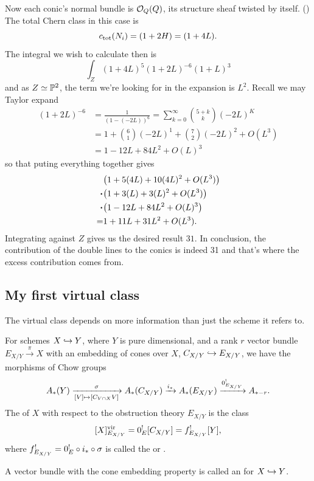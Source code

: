 \documentclass[12pt]{memoir}
\begin{document}
Now each conic's normal bundle is \(\mathcal{O}_Q(Q)\), its structure sheaf twisted by itself. () The total Chern class in this case is
\[
    c_{\operatorname{tot}}(N_i)=(1+2H)=(1+4L).
\]
The integral we wish to calculate then is
\[
    \int_Z(1+4L)^5(1+2L)^{-6}(1+L)^3
\]
and as \(Z\simeq\mathbb{P}^2\), the term we're looking for in the expansion is \(L^2\). Recall we may Taylor expand
\begin{align*}
    (1+2L)^{-6} & =\frac{1}{(1-(-2L))^6}=\sum_{k=0}^\infty\binom{5+k}{k}(-2L)^K \\
                & =1+\binom{6}{1}(-2L)^1+\binom{7}{2}(-2L)^2+O(L^3)             \\
                & =1-12L+84L^2+O(L)^3
\end{align*}
so that puting everything together gives
\begin{align*}
       & \bigl(1+5(4L)+10(4L)^2+O(L^3)\bigr) \\
    \. & \bigl(1+3(L)+3(L)^2+O(L^3)\bigr)    \\
    \. & \bigl(1-12L+84L^2+O(L)^3\bigr)      \\
    =  & 1+11L+31L^2+O(L^3).
\end{align*}
Integrating against \(Z\) gives us the desired result \(31\). In conclusion, the contribution of the double lines to the conics is indeed 31 and that's where the excess contribution comes from.

\subsection{My first virtual class}

The virtual class depends on more information than just the scheme it refers to.

\begin{Def}\label{def-virtual-class}
    For schemes \(X\hookrightarrow Y\), where \(Y\) is pure dimensional, and a rank \(r\) vector bundle \(E_{X/Y}\xrightarrow[]{\pi}X\) with an embedding of cones over \(X\), \(C_{X/Y}\hookrightarrow E_{X/Y}\), we have the morphisms of Chow groups
    \[
        A_\ast(Y)\xrightarrow[{[V]\mapsto[C_{V\cap X}V]}]{\sigma}A_\ast(C_{X/Y})\xrightarrow[]{i_\ast}A_{\ast}(E_{X/Y})\xrightarrow[]{0^{!}_{E_{X/Y}}}A_{\ast-r}.
    \]
    The  of \(X\) with respect to the obstruction theory \(E_{X/Y}\) is the class
    \[
        [X]^{\mathrm{vir}}_{E_{X/Y}}=0^{!}_E[C_{X/Y}]=f^{!}_{E_{X/Y}}[Y],
    \]
    where \(f^{!}_{E_{X/Y}}=0^{!}_E\circ i_{\ast}\circ\sigma\) is called the  or .\par
    A vector bundle with the cone embedding property is called an  for \(X\hookrightarrow Y\).
\end{Def}
\end{document}
